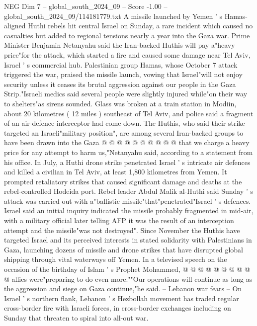 \begin{textsample}{NEG Dim 7 – global\_south\_2024\_09 – Score -1.00 – global\_south\_2024\_09/114181779.txt}  \label{ex:f7_neg_222}
A missile launched by Yemen ' s Hamas-aligned Huthi rebels hit central Israel on Sunday, a rare incident which caused no casualties but added to regional tensions nearly a year into the Gaza war.
Prime Minister Benjamin Netanyahu said the Iran-backed Huthis will pay a"heavy price"for the attack, which started a fire and caused some damage near Tel Aviv, Israel ' s commercial hub.
Palestinian group Hamas, whose October 7 attack triggered the war, praised the missile launch, vowing that Israel"will not enjoy security unless it ceases its brutal aggression against our people in the Gaza Strip."Israeli medics said several people were slightly injured while"on their way to shelters"as sirens sounded.
Glass was broken at a train station in Modiin, about 20 kilometres ( 12 miles ) southeast of Tel Aviv, and police said a fragment of an air-defence interceptor had come down.
The Huthis, who said their strike targeted an Israeli"military position", are among several Iran-backed groups to have been drawn into the Gaza @ @ @ @ @ @ @ @ @ @ that we charge a heavy price for any attempt to harm us,"Netanyahu said, according to a statement from his office.
In July, a Huthi drone strike penetrated Israel ' s intricate air defences and killed a civilian in Tel Aviv, at least 1,800 kilometres from Yemen.
It prompted retaliatory strikes that caused significant damage and deaths at the rebel-controlled Hodeida port.
Rebel leader Abdul Malik al-Huthi said Sunday ' s attack was carried out with a"ballistic missile"that"penetrated"Israel ' s defences.
Israel said an initial inquiry indicated the missile probably fragmented in mid-air, with a military official later telling AFP it was the result of an interception attempt and the missile"was not destroyed".
Since November the Huthis have targeted Israel and its perceived interests in stated solidarity with Palestinians in Gaza, launching dozens of missile and drone strikes that have disrupted global shipping through vital waterways off Yemen.
In a televised speech on the occasion of the birthday of Islam ' s Prophet Mohammed, @ @ @ @ @ @ @ @ @ @ allies were"preparing to do even more.""Our operations will continue as long as the aggression and siege on Gaza continue,"he said. -- Lebanon war fears -- On Israel ' s northern flank, Lebanon ' s Hezbollah movement has traded regular cross-border fire with Israeli forces, in cross-border exchanges including on Sunday that threaten to spiral into all-out war.

\end{textsample}
